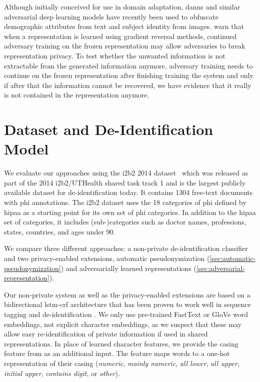 %
Although initially conceived for use in domain adaptation, \acp{dann} and similar adversarial deep learning models have recently been used to obfuscate demographic attributes from text \citep{elazar2018adversarial,li2018towards} and subject identity \citep{feutry2018learning} from images.
%
\citet{elazar2018adversarial} warn that when a representation is learned using gradient reversal methods, continued adversary training on the frozen representation may allow adversaries to break representation privacy.
%
To test whether the unwanted information is not extractable from the generated information anymore, adversary training needs to continue on the frozen representation after finishing training the system and only if after that the information cannot be recovered, we have evidence that it really is not contained in the representation anymore.

\section{Dataset and De-Identification Model}\label{sec:deidentification-model}

We evaluate our approaches using the i2b2 2014
dataset~\citep{stubbs2015annotating} which was released as part of
the 2014 i2b2/UTHealth shared task track 1 and is the largest publicly
available dataset for de-identification today.
%
It contains 1304 free-text documents with \ac{phi} annotations.
%
The i2b2 dataset uses the 18 categories of \ac{phi} defined by \ac{hipaa} as a starting point for its own set of \ac{phi} categories.
%
In addition to the \ac{hipaa} set of categories, it includes (sub-)categories such as doctor names, professions, states, countries, and ages under 90.

%
We compare three different approaches: a non-private de-identification classifier and two privacy-enabled extensions, automatic pseudonymization (\cref{sec:automatic-pseudonymization}) and adversarially learned representations (\cref{sec:adversarial-representation}).

%
Our non-private system as well as the privacy-enabled extensions are based on a bidirectional \ac{lstm}-\ac{crf} architecture that has been proven to work well in sequence tagging \citep{huang2015bidirectional,lample2016neural} and de-identification \citep{dernoncourt2017identification,liu2017identification}.
%
We only use pre-trained FastText \citep{bojanowski2017enriching} or GloVe \citep{pennington2014glove} word embeddings, not explicit character embeddings, as we suspect that these may allow easy re-identification of private information if used in shared representations.
%
In place of learned character features, we provide the casing feature from \citet{reimers2017optimal} as an additional input.
%
The feature maps words to a one-hot representation of their casing (\textit{numeric}, \textit{mainly numeric}, \textit{all lower}, \textit{all upper}, \textit{initial upper}, \textit{contains digit}, or \textit{other}).

